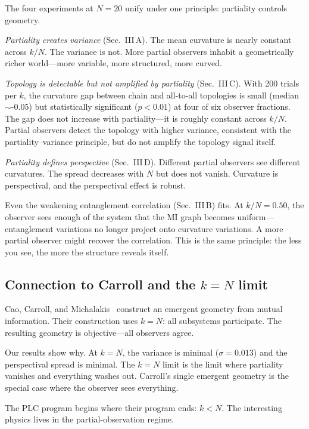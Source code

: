 \documentclass[aps,pra,twocolumn,superscriptaddress,floatfix]{revtex4-2}
\begin{document}
The four experiments at $N = 20$ unify under one principle: partiality controls geometry.

\textit{Partiality creates variance} (Sec.~III\,A).  The mean curvature is nearly constant across $k/N$.  The variance is not.  More partial observers inhabit a geometrically richer world---more variable, more structured, more curved.

\textit{Topology is detectable but not amplified by partiality} (Sec.~III\,C).  With 200 trials per $k$, the curvature gap between chain and all-to-all topologies is small (median $\sim$-0.05) but statistically significant ($p < 0.01$) at four of six observer fractions.  The gap does not increase with partiality---it is roughly constant across $k/N$.  Partial observers detect the topology with higher variance, consistent with the partiality--variance principle, but do not amplify the topology signal itself.

\textit{Partiality defines perspective} (Sec.~III\,D).  Different partial observers see different curvatures.  The spread decreases with $N$ but does not vanish.  Curvature is perspectival, and the perspectival effect is robust.

Even the weakening entanglement correlation (Sec.~III\,B) fits.  At $k/N = 0.50$, the observer sees enough of the system that the MI graph becomes uniform---entanglement variations no longer project onto curvature variations.  A more partial observer might recover the correlation.  This is the same principle: the less you see, the more the structure reveals itself.


\subsection{Connection to Carroll and the $k = N$ limit}

Cao, Carroll, and Michalakis~\cite{cao2017} construct an emergent geometry from mutual information.  Their construction uses $k = N$: all subsystems participate.  The resulting geometry is objective---all observers agree.

Our results show why.  At $k = N$, the variance is minimal ($\sigma = 0.013$) and the perspectival spread is minimal.  The $k = N$ limit is the limit where partiality vanishes and everything washes out.  Carroll's single emergent geometry is the special case where the observer sees everything.

The PLC program begins where their program ends: $k < N$.  The interesting physics lives in the partial-observation regime.
\end{document}

